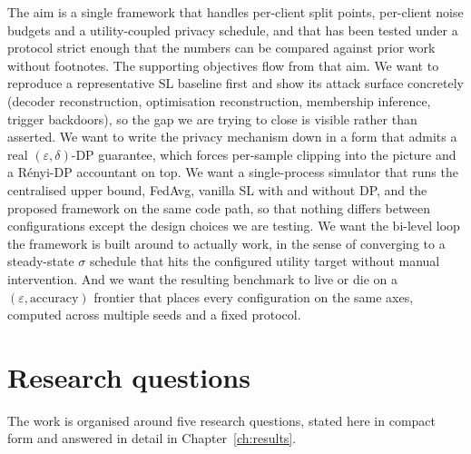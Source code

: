 \documentclass[11pt,a4paper,oneside]{report}
\begin{document}
The aim is a single framework that handles per-client split points,
per-client noise budgets and a utility-coupled privacy schedule, and
that has been tested under a protocol strict enough that the numbers
can be compared against prior work without footnotes. The supporting
objectives flow from that aim. We want to reproduce a representative
SL baseline first and show its attack surface concretely (decoder
reconstruction, optimisation reconstruction, membership inference,
trigger backdoors), so the gap we are trying to close is visible
rather than asserted. We want to write the privacy mechanism down in
a form that admits a real $(\varepsilon, \delta)$-DP guarantee, which
forces per-sample clipping into the picture and a R\'enyi-DP
accountant on top. We want a single-process simulator that runs the
centralised upper bound, FedAvg, vanilla SL with and without DP, and
the proposed framework on the same code path, so that nothing differs
between configurations except the design choices we are testing. We
want the bi-level loop the framework is built around to actually
work, in the sense of converging to a steady-state $\sigma$ schedule
that hits the configured utility target without manual intervention.
And we want the resulting benchmark to live or die on a
$(\varepsilon, \text{accuracy})$ frontier that places every
configuration on the same axes, computed across multiple seeds and a
fixed protocol.

\section{Research questions}

The work is organised around five research questions, stated here in
compact form and answered in detail in Chapter~\ref{ch:results}.
\end{document}
